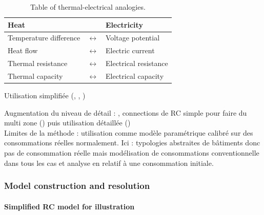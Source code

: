\documentclass[11pt]{article}
\begin{document}
        \begin{table}[ht]
          \centering
          \caption{\label{tab:analogyrc} Table of thermal-electrical analogies.}
          \begin{tabular}{lcl}
            \toprule
            Heat & & Electricity\\
            \midrule
            Temperature difference & $\leftrightarrow$ & Voltage potential\\
            Heat flow & $\leftrightarrow$ & Electric current\\
            Thermal resistance & $\leftrightarrow$ & Electrical resistance\\
            Thermal capacity & $\leftrightarrow$ & Electrical capacity\\
            \bottomrule
          \end{tabular}
        \end{table}

        Utilisation simplifiée (\cite{fraisse_development_2002}, \cite{rouchier_solving_2018}, \cite{iso_iso_2006})

        Augmentation du niveau de détail : \cite{bacher_identifying_2011}, connections de RC simple pour faire du multi zone (\cite{belazi_thermal_2022}) puis utilisation détaillée (\cite{wang_development_2019})\\

        Limites de la méthode : utilisation comme modèle paramétrique calibré sur des consommations réelles normalement. Ici : typologies abstraites de bâtiments donc pas de consommation réelle mais modélisation de consommations conventionnelle dans tous les cas et analyse en relatif à une consommation initiale. 
        

        \subsubsection{Model construction and resolution} %
        \label{ssub:model_construction}

        \paragraph{Simplified RC model for illustration}\mbox{}\\ %
        \label{par:simplified_rc_model}
\end{document}
